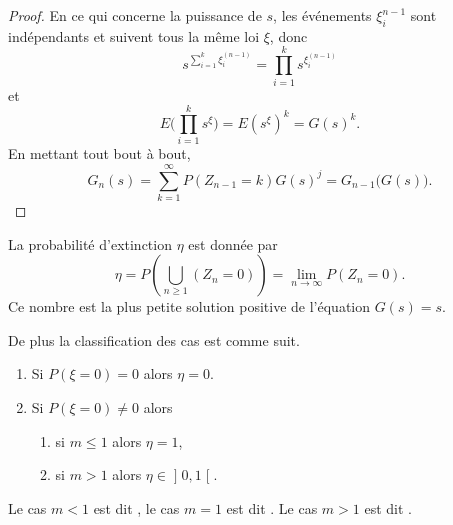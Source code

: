 \begin{proof}
    En ce qui concerne la puissance de \( s\), les événements \( \xi_i^{n-1}\) sont indépendants et suivent tous la même loi \( \xi\), donc
    \begin{equation}
        s^{\sum_{i=1}^{k}\xi_i^{(n-1)}}=\prod_{i=1}^ks^{\xi_i^{(n-1)}}
    \end{equation}
    et
    \begin{equation}
        E\big( \prod_{i=1}^ks^{\xi} \big)=E(s^{\xi})^k=G(s)^k.
    \end{equation}
    En mettant tout bout à bout,
    \begin{equation}
        G_n(s)=\sum_{k=1}^{\infty}P(Z_{n-1}=k)G(s)^j=G_{n-1}\big( G(s) \big).
    \end{equation}
\end{proof}

\begin{theorem}  \label{ThoJZnAOA}
    La probabilité d'extinction \( \eta\) est donnée par
    \begin{equation}
        \eta=P\left(\bigcup_{n\geq 1}(Z_n=0)\right)=\lim_{n\to \infty} P(Z_n=0).
    \end{equation}
    Ce nombre est la plus petite solution positive de l'équation \( G(s)=s\).

    De plus la classification des cas est comme suit.
    \begin{enumerate}
        \item
            Si \( P(\xi=0)=0\) alors \( \eta=0\).
        \item
            Si \( P(\xi=0)\neq 0\) alors
            \begin{enumerate}
                \item
                    si \( m\leq 1\) alors \( \eta=1\),
                \item
                    si \( m>1\) alors \( \eta\in\mathopen] 0 , 1 \mathclose[\).
            \end{enumerate}
    \end{enumerate}
\end{theorem}
Le cas \( m<1\) est dit , le cas \( m=1\) est dit . Le cas \( m>1\) est dit .

